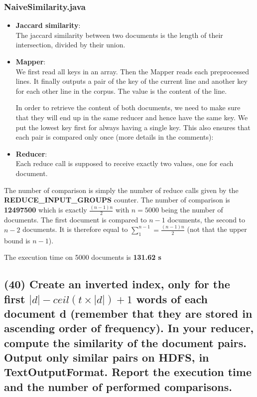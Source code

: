 \documentclass[a4paper,10pt]{article}
\begin{document}
\subsubsection{NaiveSimilarity.java}
\begin{itemize}
  \item \textbf{Jaccard similarity}:\\
  The jaccard similarity between two documents is the length of their intersection,
  divided by their union.
  

  \item \textbf{Mapper}:\\
  We first read all keys in an array.
  Then the Mapper reads each preprocessed lines. It finally outputs a pair of the
  key of the current line and another key for each other line in the corpus.
  The value is the content of the line.

  In order to retrieve the content of both documents, we need to make sure that
  they will end up in the same reducer and hence have the same key.
  We put the lowest key first for always having a single key.
  This also ensures that each pair is compared only once (more details in the comments):
  

  \item \textbf{Reducer}:\\
  Each reduce call is supposed to receive exactly two values, one for each document.
  
\end{itemize}

The number of comparison is simply the number of reduce calls given by the \textbf{REDUCE\_INPUT\_GROUPS} counter.
The number of comparison is \textbf{12497500} which is exactly $\frac{(n-1) n}{2}$ with $n=5000$ being the number of documents.
The first document is compared to $n-1$ documents, the second to $n-2$ documents.
It is therefore equal to $\sum_{1}^{n-1} = \frac{(n-1) n}{2}$ (not that the upper bound is $n-1$).

The execution time on 5000 documents is \textbf{131.62 s}

\subsection{(40) Create an inverted index, only for the first $|d| - ceil(t \times |d|) + 1$ words of each
document d (remember that they are stored in ascending order of frequency). In your
reducer, compute the similarity of the document pairs. Output only similar pairs on
HDFS, in TextOutputFormat. Report the execution time and the number of performed
comparisons.}
\end{document}
